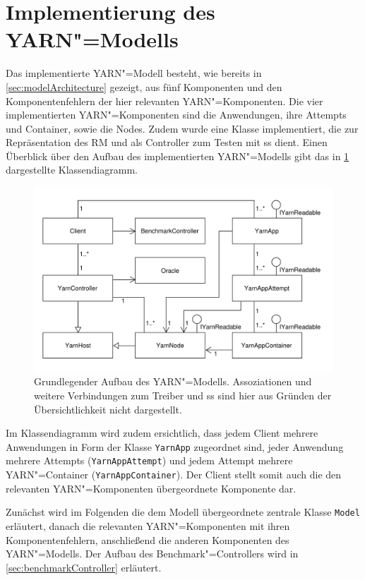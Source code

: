 \section{Implementierung des YARN"=Modells}
\label{sec:yarnModel}

Das implementierte YARN"=Modell besteht, wie bereits in \cref{sec:modelArchitecture} gezeigt, aus fünf Komponenten und den Komponentenfehlern der hier relevanten YARN"=Komponenten.
Die vier implementierten YARN"=Komponenten sind die Anwendungen, ihre Attempts und Container, sowie die Nodes.
Zudem wurde eine Klasse implementiert, die zur Repräsentation des \gls{RM} und als Controller zum Testen mit \gls{ss} dient.
Einen Überblick über den Aufbau des implementierten YARN"=Modells gibt das in \cref{fig:yarnModelClassDiagram} dargestellte Klassendiagramm.

\begin{figure}
    \includegraphics{./resources/yarnModel.pdf}
    \caption[Grundlegender Aufbau des YARN"=Modells]
        {Grundlegender Aufbau des YARN"=Modells.
        Assoziationen und weitere Verbindungen zum Treiber und \acrshort{ss} sind hier aus Gründen der Übersichtlichkeit nicht dargestellt.}
    \label{fig:yarnModelClassDiagram}
\end{figure}

Im Klassendiagramm wird zudem ersichtlich, dass jedem Client mehrere Anwendungen in Form der Klasse \texttt{YarnApp} zugeordnet sind, jeder Anwendung mehrere Attempts (\texttt{YarnAppAttempt}) und jedem Attempt mehrere YARN"=Container (\texttt{YarnAppContainer}).
Der Client stellt somit auch die den relevanten YARN"=Komponenten übergeordnete Komponente dar.

Zunächst wird im Folgenden die dem Modell übergeordnete zentrale Klasse \texttt{Model} erläutert, danach die relevanten YARN"=Komponenten mit ihren Komponentenfehlern, anschließend die anderen Komponenten des YARN"=Modells.
Der Aufbau des Benchmark"=Controllers wird in \cref{sec:benchmarkController} erläutert.

